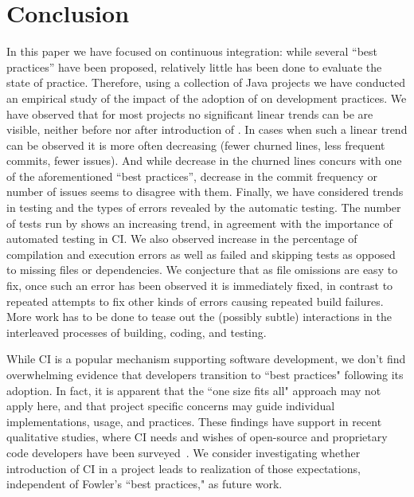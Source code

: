 
\section{Conclusion}
\label{sec:conc}

In this paper we have focused on continuous integration: while several ``best 
practices'' have been proposed, relatively little has been done to evaluate the 
state of practice.
Therefore, using a collection of Java \GH projects we have conducted an 
empirical study of the impact of the adoption of \Tvis on development practices.
We have observed that for most projects no significant linear trends can be 
are visible, neither before nor after introduction of \Tvis.
In cases when such a linear trend can be observed it is more often decreasing 
(fewer churned lines, less frequent commits, fewer issues). 
And while decrease in the churned lines concurs with one of the aforementioned 
``best practices'', decrease in the commit frequency or number of issues seems 
to disagree with them. 
Finally, we have considered trends in testing and the types of errors revealed 
by the automatic testing.
The number of tests run by \Tvis shows an increasing trend, 
in agreement with the importance of automated testing in CI.
We also observed increase in the percentage of compilation and execution errors 
as well as failed and skipping tests as opposed to missing files or dependencies.
We conjecture that as file omissions are easy to fix, once such an error has been 
observed it is immediately fixed, in contrast to repeated attempts to fix other 
kinds of errors causing repeated build failures.
More work has to be done to tease out the (possibly subtle) interactions in the 
interleaved processes of building, coding, and testing.

While CI is a popular mechanism supporting software development, we don't 
find overwhelming evidence that developers transition to ``best practices" 
following its adoption.
In fact, it is apparent that the ``one size fits all" approach may not apply here, 
and that project specific concerns may guide individual implementations, usage, 
and practices.
These findings have support in recent qualitative studies, where CI needs and 
wishes of open-source and proprietary code developers have been surveyed~\cite{Hilton2016, hilton2016continuous}.
We consider investigating whether introduction of CI in a project leads to 
realization of those expectations, independent of Fowler's ``best practices," 
as future work.

